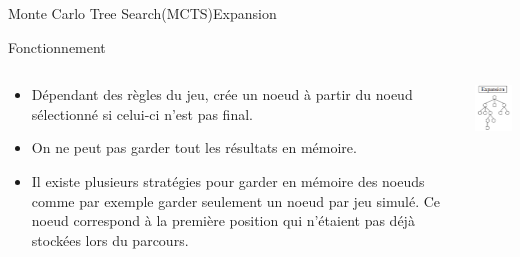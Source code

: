 \begin{frame}{Monte Carlo Tree Search(MCTS)}{Expansion}
	\begin{block}{Fonctionnement}
		\begin{columns}
			\begin{column}{8cm}
				\begin{itemize}
					\item Dépendant des règles du jeu, crée un noeud à partir du noeud sélectionné si celui-ci n'est pas final.
					\item On ne peut pas garder tout les résultats en mémoire.
					\item Il existe plusieurs stratégies pour garder en mémoire des noeuds comme par exemple garder seulement un noeud par jeu simulé. Ce noeud correspond à la première position qui n'étaient pas déjà stockées lors du parcours.
				\end{itemize}
			\end{column}
			\begin{column}{4cm}
				\includegraphics[width=3cm]{ressources/Expansion.png}
			\end{column}
		\end{columns}
	\end{block}
\end{frame}

